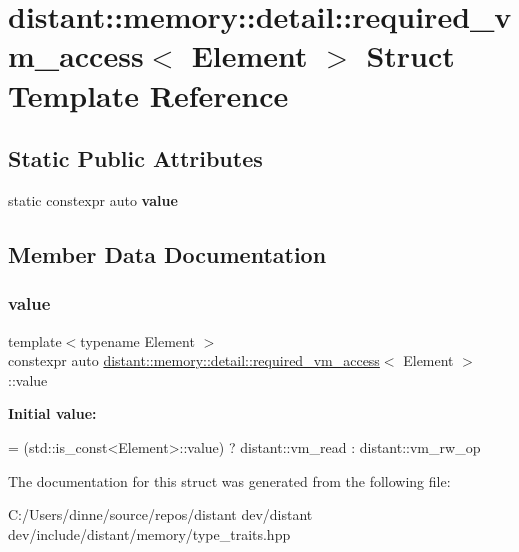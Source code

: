 \hypertarget{structdistant_1_1memory_1_1detail_1_1required__vm__access}{}\section{distant\+:\+:memory\+:\+:detail\+:\+:required\+\_\+vm\+\_\+access$<$ Element $>$ Struct Template Reference}
\label{structdistant_1_1memory_1_1detail_1_1required__vm__access}
\subsection*{Static Public Attributes}
\begin{DoxyCompactItemize}
\item 
static constexpr auto {\bfseries value}
\end{DoxyCompactItemize}


\subsection{Member Data Documentation}
\mbox{\label{structdistant_1_1memory_1_1detail_1_1required__vm__access_ac0f150a75b4fed1af0193654cfb014dc}} 
\subsubsection{\texorpdfstring{value}{value}}
{\footnotesize\ttfamily template$<$typename Element $>$ \\
constexpr auto \mbox{\hyperlink{structdistant_1_1memory_1_1detail_1_1required__vm__access}{distant\+::memory\+::detail\+::required\+\_\+vm\+\_\+access}}$<$ Element $>$\+::value\hspace{0.3cm}{\ttfamily [static]}}

{\bfseries Initial value\+:}
\begin{DoxyCode}
=
                (std::is\_const<Element>::value) ? distant::vm\_read : distant::vm\_rw\_op
\end{DoxyCode}


The documentation for this struct was generated from the following file\+:\begin{DoxyCompactItemize}
\item 
C\+:/\+Users/dinne/source/repos/distant dev/distant dev/include/distant/memory/type\+\_\+traits.\+hpp\end{DoxyCompactItemize}
